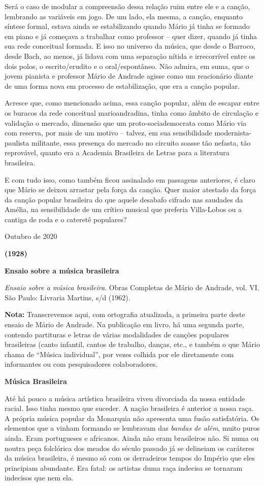 Será o caso de modular a compreensão dessa relação ruim entre ele e a
canção, lembrando as variáveis em jogo. De um lado, ela mesma, a canção,
enquanto síntese formal, estava ainda se estabilizando quando Mário já
tinha se formado em piano e já começava a trabalhar como professor --
quer dizer, quando já tinha sua rede conceitual formada. E isso no
universo da música, que desde o Barroco, desde Bach, ao menos, já lidava
com uma separação nítida e irrecorrível entre os dois polos, o
escrito/erudito e o oral/espontâneo. Não admira, em suma, que o jovem
pianista e professor Mário de Andrade agisse como um reacionário diante
de uma forma nova em processo de estabilização, que era a canção
popular.

Acresce que, como mencionado acima, essa canção popular, além de escapar
entre os buracos da rede conceitual marioandradina, tinha como âmbito de
circulação e validação o mercado, dimensão que um proto-sociademocrata
como Mário via com reserva, por mais de um motivo -- talvez, em sua
sensibilidade modernista-paulista militante, essa presença do mercado no
circuito soasse tão nefasta, tão reprovável, quanto era a Academia
Brasileira de Letras para a literatura brasileira.

E com tudo isso, como também ficou assinalado em passagens anteriores, é
claro que Mário se deixou arrastar pela força da canção. Quer maior
atestado da força da canção popular brasileira do que aquele desabafo
cifrado nas saudades da Amélia, na sensibilidade de um crítico musical
que preferia Villa-Lobos ou a cantiga de roda e o cateretê populares?

Outubro de 2020

\textbf{(1928)}

\textbf{Ensaio sobre a música brasileira}

\emph{Ensaio sobre a música brasileira}. Obras Completas de Mário de
Andrade, vol. VI. São Paulo: Livraria Martins, s/d (1962).

\textbf{Nota:} Transcrevemos aqui, com ortografia atualizada, a primeira
parte deste ensaio de Mário de Andrade. Na publicação em livro, há uma
segunda parte, contendo partituras e letras de várias modalidades de
canções populares brasileiras (canto infantil, cantos de trabalho,
danças, etc., e também o que Mário chama de ``Música individual'', por
vezes colhida por ele diretamente com informantes ou com pesquisadores
colaboradores.

\textbf{Música Brasileira}

Até há pouco a música artística brasileira viveu divorciada da nossa
entidade racial. Isso tinha mesmo que suceder. A nação brasileira é
anterior a nossa raça. A própria música popular da Monarquia não
apresenta uma fusão satisfatória. Os elementos que a vinham formando se
lembravam das \emph{bandas de além}, muito puros ainda. Eram portugueses
e africanos. Ainda não eram brasileiros não. Si numa ou noutra peça
folclórica dos meados do século passado já se delineiam os caráteres da
música brasileira, é mesmo só com os derradeiros tempos do Império que
eles principiam abundante. Era fatal: os artistas duma raça indecisa se
tornaram indecisos que nem ela.~

